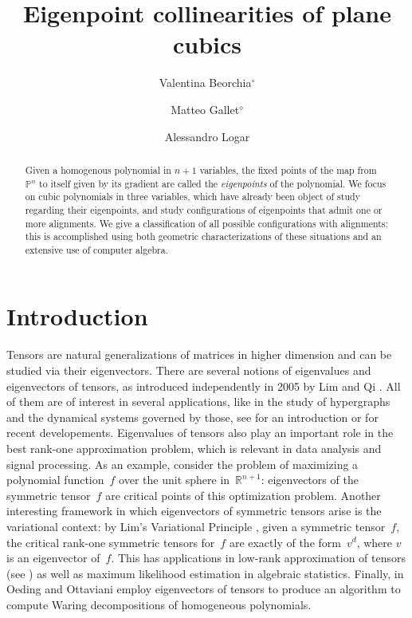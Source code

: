 \documentclass{amsart}
\title{Eigenpoint collinearities of plane cubics}
\author[Valentina Beorchia]{Valentina Beorchia$^{\circ}$}
\author[Matteo Gallet]{Matteo Gallet$^{\diamond}$}
\author[Alessandro Logar]{Alessandro Logar}
\date{}
\theoremstyle{plain}
\theoremstyle{definition}
\newcommand{\R}{\mathbb{R}}
\newcommand{\p}{\mathbb{P}}
\begin{document}
\maketitle

\begin{abstract}
 Given a homogenous polynomial in $n+1$ variables, the fixed points of the map from $\p^n$ to itself given by its gradient are called the \emph{eigenpoints} of the polynomial. We focus on cubic polynomials in three variables, which have already been object of study regarding their eigenpoints, and study configurations of eigenpoints that admit one or more alignments. We give a classification of all possible configurations with alignments: this is accomplished using both geometric characterizations of these situations and an extensive use of computer algebra.
\end{abstract}

\section{Introduction}
\label{introduction}

Tensors are natural generalizations of matrices in higher dimension and can be studied via their eigenvectors. There are several notions of eigenvalues and eigenvectors of tensors, as introduced independently in 2005 by Lim \cite{Lim} and Qi \cite{Qi}. All of them are of interest in several applications, like in the study of hypergraphs and the dynamical systems governed by those, see \cite[Section 4]{QZ} for an introduction or \cite{GMV} for recent developements. Eigenvalues of tensors also play an important role in the best rank-one approximation problem, which is relevant in data analysis and signal processing.
As an example, consider the problem of maximizing a polynomial function~$f$ over the unit sphere in~$\R^{n+1}$: eigenvectors of the symmetric tensor~$f$ are critical points of this optimization problem. Another interesting framework in which eigenvectors of symmetric tensors arise is the variational context: by Lim's Variational Principle \cite{Lim}, given a symmetric tensor~$f$, the critical rank-one symmetric tensors for~$f$ are exactly of the form~$v^d$, where $v$ is an eigenvector of~$f$.
This has applications in low-rank approximation of tensors (see \cite{OttSod}) as well as maximum likelihood estimation in algebraic statistics. Finally, in \cite{OO} Oeding and Ottaviani employ eigenvectors of tensors to produce an algorithm to compute Waring decompositions of homogeneous polynomials.
\end{document}
